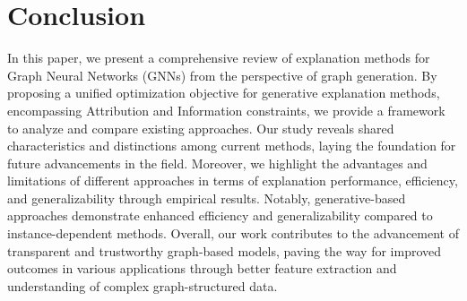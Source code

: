 \section{Conclusion}
In this paper, we present a comprehensive review of explanation methods for Graph Neural Networks (GNNs) from the perspective of graph generation. By proposing a unified optimization objective for generative explanation methods, encompassing Attribution and Information constraints, we provide a framework to analyze and compare existing approaches. Our study reveals shared characteristics and distinctions among current methods, laying the foundation for future advancements in the field. Moreover, we highlight the advantages and limitations of different approaches in terms of explanation performance, efficiency, and generalizability through empirical results. Notably, generative-based approaches demonstrate enhanced efficiency and generalizability compared to instance-dependent methods. Overall, our work contributes to the advancement of transparent and trustworthy graph-based models, paving the way for improved outcomes in various applications through better feature extraction and understanding of complex graph-structured data.